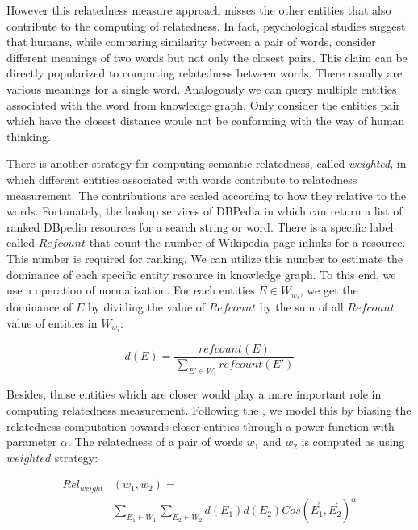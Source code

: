 However this relatedness measure approach misses the other entities that also contribute to the computing of relatedness.
In fact, psychological studies suggest that humans, while comparing similarity between a pair of words, consider
different meanings of two words but not only the closest pairs\cite{Tversky77}. This claim can be directly popularized to computing
relatedness between words. There usually are various meanings for a single word. Analogously we can query multiple
entities associated with the word from knowledge graph. Only consider the entities pair which have the closest distance
woule not be conforming with the way of human thinking.

There is another strategy for computing semantic relatedness, called \emph{weighted}, in which
different entities associated with words contribute to relatedness measurement. The contributions are
scaled according to how they relative to the words. Fortunately, the lookup services of DBPedia in which can
return a list of ranked DBpedia resources for a search string or word. There is a specific label called
$Refcount$ that count the number of Wikipedia page inlinks for a resource. This number is required for ranking.
We can utilize this number to estimate the dominance of each specific entity resource in knowledge graph.
To this end, we use a operation of normalization. For each entities $E \in W_{w_i}$, we get the dominance of
$E$ by dividing the value of $Refcount$ by the sum of all $Refcount$ value of entities in  $W_{w_i}$:

\begin{small}
    \begin{equation}
        \label{cos}
        \nonumber
        d(E) = \frac{refcount(E)}{\sum_{{E}'\in W_i} refcount({E}')}
    \end{equation}
\end{small}

Besides, those entities which are closer would play a more important role in computing relatedness measurement.
Following the \cite{acl/IacobacciPN15}, we model this by biasing the relatedness computation towards closer entities through a power function with
parameter $\alpha$. The relatedness of a pair of words $w_1$ and $w_2$ is computed as using $weighted$ strategy:

\begin{small}
    \begin{equation}
        \begin{split}
        \label{cos}
        \nonumber
        Rel_{weight}&(w_1, w_2)=\\ 
        &\sum_{E_1 \in W_1}\sum_{E_2 \in W_2}d(E_1)d(E_2)Cos(\overrightarrow E_1,\overrightarrow E_2)^\alpha 
        \end{split}
    \end{equation}
\end{small}

